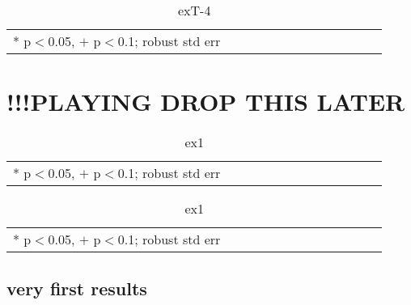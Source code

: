 \documentclass[10pt, letterpaper]{article}
\begin{document}
\begin{spacing}{1.4}
\begin{spacing}{.9} \begin{table}[H]\centering \caption{.} \label{d1} \begin{scriptsize} \begin{tabular}{p{1.8in}p{.5in}p{.5in}p{.5in}p{.5in}p{.5in}p{.5in}p{.5in}p{.5in}p{.5in}p{.5 in}p{.5in}p{.5 in}}\hline  \hline   * p$<$0.05, $+$ p$<$0.1; robust std err \end{tabular}\end{scriptsize}\caption{exT-4}\end{table} \end{spacing}

\section{!!!PLAYING DROP THIS LATER}


\begin{spacing}{.9} \begin{table}[H]\centering \caption{.} \label{d1} \begin{scriptsize} \begin{tabular}{p{1.8in}p{.5in}p{.5in}p{.5in}p{.5in}p{.5in}p{.5in}p{.5in}p{.5in}p{.5in}p{.5 in}p{.5in}p{.5 in}}\hline  \hline   * p$<$0.05, $+$ p$<$0.1; robust std err \end{tabular}\end{scriptsize}\caption{ex1}\end{table} \end{spacing}

\begin{spacing}{.9} \begin{table}[H]\centering \caption{.} \label{d1} \begin{scriptsize} \begin{tabular}{p{1.8in}p{.5in}p{.5in}p{.5in}p{.5in}p{.5in}p{.5in}p{.5in}p{.5in}p{.5in}p{.5 in}p{.5in}p{.5 in}}\hline  \hline   * p$<$0.05, $+$ p$<$0.1; robust std err \end{tabular}\end{scriptsize}\caption{ex1}\end{table} \end{spacing}



\subsection{very first results}


\end{spacing}
\end{document}
